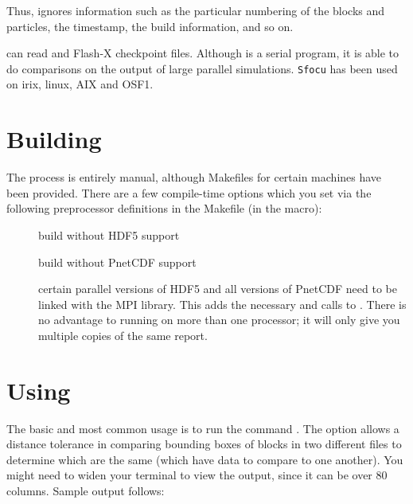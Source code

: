 Thus,  ignores information such as the particular numbering of the
blocks and particles, the timestamp, the build information, and so on.

 can read  and 
Flash-X checkpoint files. Although  is a
serial program, it is able to do comparisons on the output of large
parallel simulations.  \texttt{Sfocu} has been used on irix, linux,
AIX and OSF1.

\section{Building }
\label{Sec:building sfocu}

The process is entirely manual, although Makefiles for certain machines have
been provided. There are a few compile-time options which you set via the
following preprocessor definitions in the Makefile (in the
 macro):

\begin{description}
\item[] build without HDF5 support
\item[] build without PnetCDF support
\item[] certain parallel versions of HDF5 and all versions of PnetCDF
need to be linked with the MPI library.  This adds the necessary
 and  calls to .
There is no advantage to running  on more than one
processor; it will only give you multiple copies of the same report.
\end{description}


\section{Using }
\label{Sec:using sfocu}

The basic and most common usage is to run the command . The option  allows a distance tolerance in comparing bounding boxes of blocks 
in two different files to determine which are the same (which have data to compare to one another).
You might need to widen your terminal to view the output,
since it can be over 80 columns. Sample output follows:

